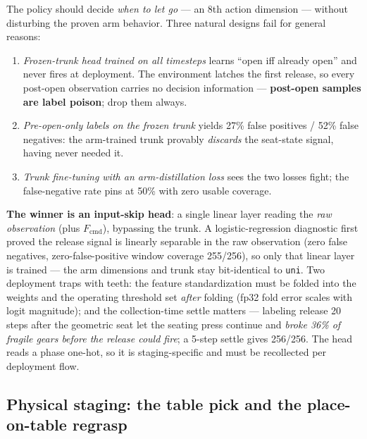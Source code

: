 \documentclass[11pt]{article}
\newcommand{\Fcmd}{\ensuremath{F_{\mathrm{cmd}}}}
\newcommand{\code}[1]{\texttt{\small #1}}
\begin{document}
The policy should decide \emph{when to let go} --- an 8th action dimension --- without disturbing the proven arm behavior. Three natural designs fail for general reasons:
\begin{enumerate}
  \item \emph{Frozen-trunk head trained on all timesteps} learns ``open iff already open'' and never fires at deployment. The environment latches the first release, so every post-open observation carries no decision information --- \textbf{post-open samples are label poison}; drop them always.
  \item \emph{Pre-open-only labels on the frozen trunk} yields 27\% false positives / 52\% false negatives: the arm-trained trunk provably \emph{discards} the seat-state signal, having never needed it.
  \item \emph{Trunk fine-tuning with an arm-distillation loss} sees the two losses fight; the false-negative rate pins at 50\% with zero usable coverage.
\end{enumerate}
\textbf{The winner is an input-skip head}: a single linear layer reading the \emph{raw observation} (plus \Fcmd), bypassing the trunk. A logistic-regression diagnostic first proved the release signal is linearly separable in the raw observation (zero false negatives, zero-false-positive window coverage 255/256), so only that linear layer is trained --- the arm dimensions and trunk stay bit-identical to \code{uni}. Two deployment traps with teeth: the feature standardization must be folded into the weights and the operating threshold set \emph{after} folding (fp32 fold error scales with logit magnitude); and the collection-time settle matters --- labeling release 20 steps after the geometric seat let the seating press continue and \emph{broke 36\% of fragile gears before the release could fire}; a 5-step settle gives 256/256. The head reads a phase one-hot, so it is staging-specific and must be recollected per deployment flow.

\subsection{Physical staging: the table pick and the place-on-table regrasp}
\label{sec:staging}
\end{document}
